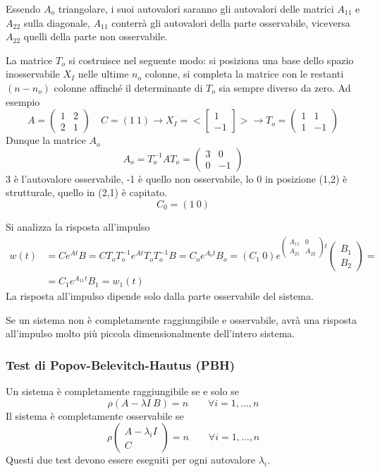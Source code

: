 Essendo $A_o$ triangolare, i suoi autovalori saranno gli autovalori delle
matrici $A_{11}$ e $A_{22}$ sulla diagonale, $A_{11}$ conterrà gli autovalori
della parte osservabile, viceversa $A_{22}$ quelli della parte non osservabile.

La matrice $T_o$ si costruisce nel seguente modo: si posiziona una base dello
spazio inosservabile $X_I$ nelle ultime $n_o$ colonne, si completa la matrice
con le restanti $(n-n_o)$ colonne affinché il determinante di $T_o$ sia sempre
diverso da zero.
Ad esempio
$$
A= \begin{pmatrix}
1 & 2 \\ 2 & 1
\end{pmatrix}\quad
C = (1\ 1)\rightarrow
X_I = <\begin{bmatrix}
1 \\ -1
\end{bmatrix}>
\rightarrow
T_o = \begin{pmatrix}
1 & 1 \\
1 & -1
\end{pmatrix}
$$
Dunque la matrice $A_o$
$$
A_o = T_o^{-1} A T_o = \begin{pmatrix}
3 & 0 \\
0 & -1
\end{pmatrix}
$$
3 è l'autovalore osservabile, -1 è quello non osservabile, lo 0 in posizione
(1,2) è strutturale, quello in (2,1) è capitato.
$$
C_0 = (1\ 0)
$$

\newpage
Si analizza la risposta all'impulso
$$\begin{aligned}
w(t) &= Ce^{At}B = CT_oT_o^{-1}e^{At} T_oT_o^{-1}B = C_o e^{A_ot}B_o = (C_1\ 0)
e^{\begin{pmatrix}
A_{11} & 0 \\
A_{21} & A_{22}
\end{pmatrix}t
}\begin{pmatrix}
B_1 \\ B_2
\end{pmatrix} = \\
&=C_1 e ^{A_{11}t}B_1 = w_1(t)
\end{aligned}
$$
La risposta all'impulso dipende solo dalla parte osservabile del sistema.

Se un sistema non è completamente raggiungibile e osservabile, avrà una
risposta all'impulso molto più piccola dimensionalmente dell'intero sistema.

\subsubsection{Test di Popov-Belevitch-Hautus (PBH)}
Un sistema è completamente raggiungibile se e solo se
$$
\rho(A-\lambda I \ B) = n\qquad \forall i = 1,\dots, n
$$
Il sistema è completamente osservabile se
$$
\rho \begin{pmatrix}
A-\lambda_i I \\
C
\end{pmatrix} = n \qquad\forall i =1,\dots,n
$$
Questi due test devono essere eseguiti per ogni autovalore $\lambda_i$.
